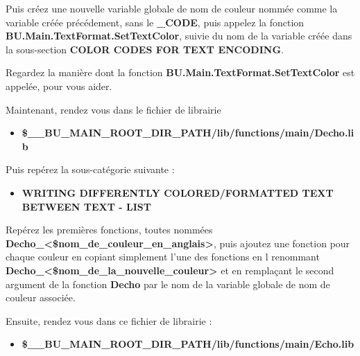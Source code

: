 \documentclass[a4paper,10pt]{article}
\begin{document}
\begin{justify}
    Puis créez une nouvelle variable globale de nom de couleur nommée comme la variable créée précédement, sans le \textbf{\color{vars}\_CODE}, puis appelez la fonction \textbf{\color{mauve}BU.Main.TextFormat.SetTextColor}, suivie du nom de la variable créée dans la sous-section \textbf{COLOR CODES FOR TEXT ENCODING}.
\end{justify}

\begin{justify}
    Regardez la manière dont la fonction \textbf{\color{mauve}BU.Main.TextFormat.SetTextColor} est appelée, pour vous aider.\\\mbox{}
\end{justify}

\begin{justify}
	Maintenant, rendez vous dans le fichier de librairie

	\begin{itemize}
    	\item \textbf{\color{vars}\$\_\_BU\_MAIN\_ROOT\_DIR\_PATH\color{path}/lib/functions/main/Decho.lib}
	\end{itemize}
\end{justify}

\begin{justify}
	Puis repérez la sous-catégorie suivante :

	\begin{itemize}
    	\item \textbf{WRITING DIFFERENTLY COLORED/FORMATTED TEXT BETWEEN TEXT - LIST}
	\end{itemize}
\end{justify}

\begin{justify}
	Repérez les premières fonctions, toutes nommées \textbf{\color{mauve}Decho\_<\$nom\_de\_couleur\_en\_anglais>}, puis ajoutez une fonction pour chaque couleur en copiant simplement l'une des fonctions en l renommant \textbf{\color{mauve}Decho\_<\$nom\_de\_la\_nouvelle\_couleur>} et en remplaçant le second argument de la fonction \textbf{\color{mauve}Decho} par le nom de la variable globale de nom de couleur associée.\\\mbox{}
\end{justify}

\begin{justify}
	Ensuite, rendez vous dans ce fichier de librairie :

	\begin{itemize}
		\item \textbf{\color{vars}\$\_\_BU\_MAIN\_ROOT\_DIR\_PATH\color{path}/lib/functions/main/Echo.lib}
	\end{itemize}
\end{justify}
\end{document}
